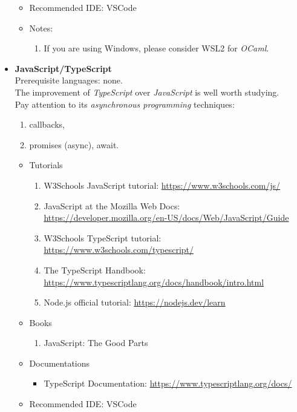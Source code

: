 \documentclass{article}
\begin{document}
\begin{itemize}
\begin{itemize}
\begin{itemize}
        \end{itemize}
        \item Recommended IDE: VSCode
        \item Notes:
            \begin{enumerate}
                \item If you are using Windows, please consider WSL2 for \emph{OCaml}.
            \end{enumerate}
    \end{itemize}    
    \item \textbf{JavaScript/TypeScript}\\
    Prerequisite languages: none.\\
    The improvement of \emph{TypeScript} over \emph{JavaScript} is well worth studying.\\
    Pay attention to its \emph{asynchronous programming} techniques:
    \begin{enumerate}
        \item callbacks,
        \item promises (async), await.
    \end{enumerate}
\begin{itemize}
    \item Tutorials   
    \begin{enumerate}
        \item W3Schools JavaScript tutorial:
        \href{https://www.w3schools.com/js/}{https://www.w3schools.com/js/}
        \item JavaScript at the Mozilla Web Docs:\\
        \href{https://developer.mozilla.org/en-US/docs/Web/JavaScript/Guide}{https://developer.mozilla.org/en-US/docs/Web/JavaScript/Guide}
        \item W3Schools TypeScript tutorial:
        \href{https://www.w3schools.com/typescript/}{https://www.w3schools.com/typescript/}
        \item The TypeScript Handbook:\\
        \href{https://www.typescriptlang.org/docs/handbook/intro.html}{https://www.typescriptlang.org/docs/handbook/intro.html}
        \item Node.js official tutorial:
        \href{https://nodejs.dev/learn}{https://nodejs.dev/learn}
    \end{enumerate}
    \item Books
    \begin{enumerate}
        \item JavaScript: The Good Parts
        \cite{crockford2008javascript}
    \end{enumerate}
    \item Documentations
    \begin{itemize}
        \item TypeScript Documentation:
        \href{https://www.typescriptlang.org/docs/}{https://www.typescriptlang.org/docs/}
    \end{itemize}
    \item Recommended IDE: VSCode
\end{itemize}

\end{itemize}
\end{document}
